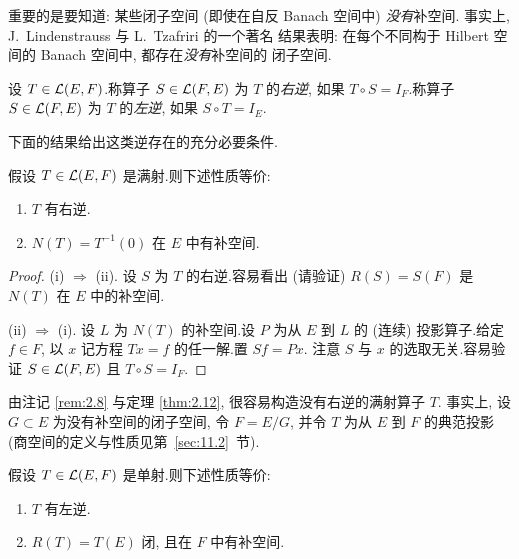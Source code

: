 \begin{remark}
\label{rem:2.8}
重要的是要知道: 某些闭子空间 (即使在自反 Banach 空间中) \emph{没有}补空间.
事实上, J.~Lindenstrauss 与 L.~Tzafriri  的一个著名
结果表明: 在每个不同构于 Hilbert 空间的 Banach 空间中, 都存在\emph{没有}补空间的
闭子空间.
\end{remark}

\begin{definition}
设 $T\in\mathcal{L}(E,F)$.称算子 $S\in\mathcal{L}(F,E)$ 为 $T$ 的\emph{右逆}, 如果
$T\circ S=I_F$.称算子 $S\in\mathcal{L}(F,E)$ 为 $T$ 的\emph{左逆}, 如果
$S\circ T=I_E$.
\end{definition}

下面的结果给出这类逆存在的充分必要条件.

\begin{startheorem}
\label{thm:2.12}
假设 $T\in\mathcal{L}(E,F)$ 是满射.则下述性质等价:
\begin{enumerate}[label=(\roman*), leftmargin=2.4em, itemsep=0.15em]
	\item $T$ 有右逆.
	\item $N(T)=T^{-1}(0)$ 在 $E$ 中有补空间.
\end{enumerate}
\end{startheorem}

\begin{proof}
(i) $\Rightarrow$ (ii). 设 $S$ 为 $T$ 的右逆.容易看出 (请验证) $R(S)=S(F)$ 是
$N(T)$ 在 $E$ 中的补空间.

(ii) $\Rightarrow$ (i). 设 $L$ 为 $N(T)$ 的补空间.设 $P$ 为从 $E$ 到 $L$ 的
(连续) 投影算子.给定 $f\in F$, 以 $x$ 记方程 $Tx=f$ 的任一解.置 $Sf=Px$.
注意 $S$ 与 $x$ 的选取无关.容易验证 $S\in\mathcal{L}(F,E)$ 且 $T\circ S=I_F$.
\end{proof}

\begin{remark}
\label{rem:2.9}
由注记 \ref{rem:2.8} 与定理  \ref{thm:2.12}, 很容易构造没有右逆的满射算子 $T$.
事实上, 设 $G\subset E$ 为没有补空间的闭子空间, 令 $F=E/G$, 并令 $T$ 为从 $E$ 到
$F$ 的典范投影 (商空间的定义与性质见第~\ref{sec:11.2}~节).
\end{remark}

\begin{startheorem}
\label{thm:2.13}
假设 $T\in\mathcal{L}(E,F)$ 是单射.则下述性质等价:
\begin{enumerate}[label=(\roman*), leftmargin=2.4em, itemsep=0.15em]
	\item $T$ 有左逆.
	\item $R(T)=T(E)$ 闭, 且在 $F$ 中有补空间.
\end{enumerate}
\end{startheorem}

